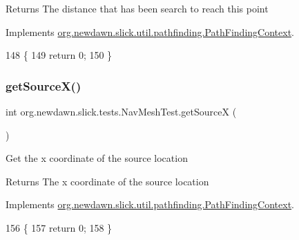 \begin{DoxyReturn}{Returns}
The distance that has been search to reach this point 
\end{DoxyReturn}


Implements \mbox{\hyperlink{interfaceorg_1_1newdawn_1_1slick_1_1util_1_1pathfinding_1_1_path_finding_context_af6c873041cbca8ad6edfd63c6e10d243}{org.\+newdawn.\+slick.\+util.\+pathfinding.\+Path\+Finding\+Context}}.


\begin{DoxyCode}
148                                    \{
149         \textcolor{keywordflow}{return} 0;
150     \}
\end{DoxyCode}
\mbox{\label{classorg_1_1newdawn_1_1slick_1_1tests_1_1_nav_mesh_test_af3706d73f28af86dd69006f8095f76ef}} 
\subsubsection{\texorpdfstring{get\+Source\+X()}{getSourceX()}}
{\footnotesize\ttfamily int org.\+newdawn.\+slick.\+tests.\+Nav\+Mesh\+Test.\+get\+SourceX (\begin{DoxyParamCaption}{ }\end{DoxyParamCaption})\hspace{0.3cm}{\ttfamily [inline]}}

Get the x coordinate of the source location

\begin{DoxyReturn}{Returns}
The x coordinate of the source location 
\end{DoxyReturn}


Implements \mbox{\hyperlink{interfaceorg_1_1newdawn_1_1slick_1_1util_1_1pathfinding_1_1_path_finding_context_a7b67cdc7d0eaf54e6e07d09b1a575065}{org.\+newdawn.\+slick.\+util.\+pathfinding.\+Path\+Finding\+Context}}.


\begin{DoxyCode}
156                             \{
157         \textcolor{keywordflow}{return} 0;
158     \}
\end{DoxyCode}
\mbox{\label{classorg_1_1newdawn_1_1slick_1_1tests_1_1_nav_mesh_test_a97359fb033667ef886d266231204adcf}} 
